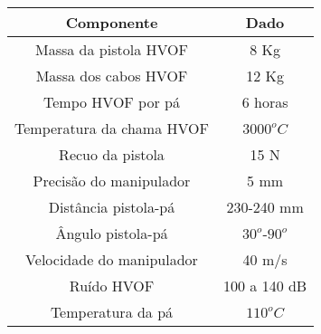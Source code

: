 \begin{center}
\begin{tabular}{  c | c  }
  \hline
  \textbf{Componente} & \textbf{Dado} \\ \hline
  Massa da pistola HVOF & 8 Kg  \\ \hline
  Massa dos cabos HVOF & 12 Kg  \\ \hline
  Tempo HVOF por pá & 6 horas \\ \hline
  Temperatura da chama HVOF & $3000^oC$ \\ \hline
  Recuo da pistola & 15 N \\ \hline
  Precisão do manipulador & 5 mm \\ \hline
  Distância pistola-pá & 230-240 mm \\ \hline
  Ângulo pistola-pá & $30^o$-$90^o$ \\ \hline
  Velocidade do manipulador & 40 m/s \\ \hline
  Ruído HVOF & 100 a 140 dB \\ \hline
  Temperatura da pá & $110^oC$ \\
  \hline
\end{tabular}
\label{tab::hvof}
\end{center}


